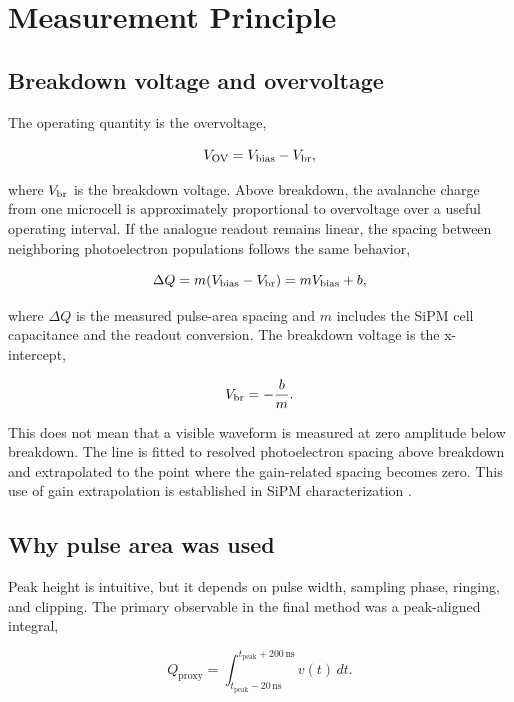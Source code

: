 \section{Measurement Principle}

\subsection{Breakdown voltage and overvoltage}

The operating quantity is the overvoltage,

\begin{equation}
  V_{\mathrm{OV}} = V_{\mathrm{bias}}-V_{\mathrm{br}},
  \label{eq:overvoltage}
\end{equation}

where $V_{\mathrm{br}}$ is the breakdown voltage. Above breakdown, the avalanche charge from one microcell is approximately proportional to overvoltage over a useful operating interval. If the analogue readout remains linear, the spacing between neighboring photoelectron populations follows the same behavior,

\begin{equation}
  \Delta Q = m(V_{\mathrm{bias}}-V_{\mathrm{br}})=mV_{\mathrm{bias}}+b,
  \label{eq:gain-line}
\end{equation}

where $\Delta Q$ is the measured pulse-area spacing and $m$ includes the SiPM cell capacitance and the readout conversion. The breakdown voltage is the x-intercept,

\begin{equation}
  V_{\mathrm{br}}=-\frac{b}{m}.
  \label{eq:vbr}
\end{equation}

This does not mean that a visible waveform is measured at zero amplitude below breakdown. The line is fitted to resolved photoelectron spacing above breakdown and extrapolated to the point where the gain-related spacing becomes zero. This use of gain extrapolation is established in SiPM characterization \cite{chmill2017,klanner2019}.

\subsection{Why pulse area was used}

Peak height is intuitive, but it depends on pulse width, sampling phase, ringing, and clipping. The primary observable in the final method was a peak-aligned integral,

\begin{equation}
  Q_{\mathrm{proxy}} = \int_{t_{\mathrm{peak}}-20\,\mathrm{ns}}^{t_{\mathrm{peak}}+200\,\mathrm{ns}}
  v(t)\,dt.
  \label{eq:pulse-area}
\end{equation}

